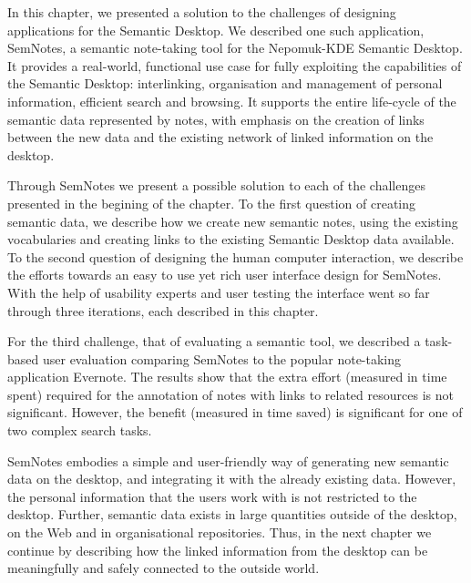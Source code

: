 In this chapter, we presented a solution to the challenges of designing applications for the Semantic Desktop. We described one such application, SemNotes, a semantic note-taking tool for the Nepomuk-KDE Semantic Desktop. It provides a real-world, functional use case for fully exploiting the capabilities of the Semantic Desktop: interlinking, organisation and management of personal information, efficient search and browsing. It supports the entire life-cycle of the semantic data represented by notes, with emphasis on the creation of links between the new data and the existing network of linked information on the desktop. 

Through SemNotes we present a possible solution to each of the challenges presented in the begining of the chapter. To the first question of creating semantic data, we describe how we create new semantic notes, using the existing vocabularies and creating links to the existing Semantic Desktop data available. To the second question of designing the human computer interaction, we describe the efforts towards an easy to use yet rich user interface design for SemNotes. With the help of usability experts and user testing the interface went so far through three iterations, each described in this chapter.

For the third challenge, that of evaluating a semantic tool, we described a task-based user evaluation comparing SemNotes to the popular note-taking application Evernote. The results show that the extra effort (measured in time spent) required for the annotation of notes with links to related resources is not significant. However, the benefit (measured in time saved) is significant for one of two complex search tasks. 

SemNotes embodies a simple and user-friendly way of generating new semantic data on the desktop, and integrating it with the already existing data. However, the personal information that the users work with is not restricted to the desktop. Further, semantic data exists in large quantities outside of the desktop, on the Web and in organisational repositories. Thus, in the next chapter we continue by describing how the linked information from the desktop can be meaningfully and safely connected to the outside world.
